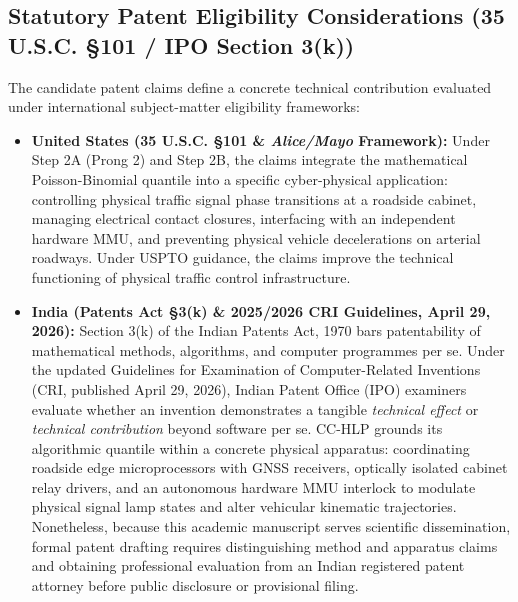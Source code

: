 \documentclass[journal,10pt,twocolumn]{IEEEtran}
\begin{document}
\subsection{Statutory Patent Eligibility Considerations (35 U.S.C. \S 101 / IPO Section 3(k))}
The candidate patent claims define a concrete technical contribution evaluated under international subject-matter eligibility frameworks:
\begin{itemize}
    \item \textbf{United States (35 U.S.C. \S 101 \& \emph{Alice/Mayo} Framework):} Under Step 2A (Prong 2) and Step 2B, the claims integrate the mathematical Poisson-Binomial quantile into a specific cyber-physical application: controlling physical traffic signal phase transitions at a roadside cabinet, managing electrical contact closures, interfacing with an independent hardware MMU, and preventing physical vehicle decelerations on arterial roadways. Under USPTO guidance, the claims improve the technical functioning of physical traffic control infrastructure.
    \item \textbf{India (Patents Act \S 3(k) \& 2025/2026 CRI Guidelines, April 29, 2026):} Section 3(k) of the Indian Patents Act, 1970 bars patentability of mathematical methods, algorithms, and computer programmes per se. Under the updated Guidelines for Examination of Computer-Related Inventions (CRI, published April 29, 2026), Indian Patent Office (IPO) examiners evaluate whether an invention demonstrates a tangible \emph{technical effect} or \emph{technical contribution} beyond software per se. CC-HLP grounds its algorithmic quantile within a concrete physical apparatus: coordinating roadside edge microprocessors with GNSS receivers, optically isolated cabinet relay drivers, and an autonomous hardware MMU interlock to modulate physical signal lamp states and alter vehicular kinematic trajectories. Nonetheless, because this academic manuscript serves scientific dissemination, formal patent drafting requires distinguishing method and apparatus claims and obtaining professional evaluation from an Indian registered patent attorney before public disclosure or provisional filing.
\end{itemize}
\end{document}
